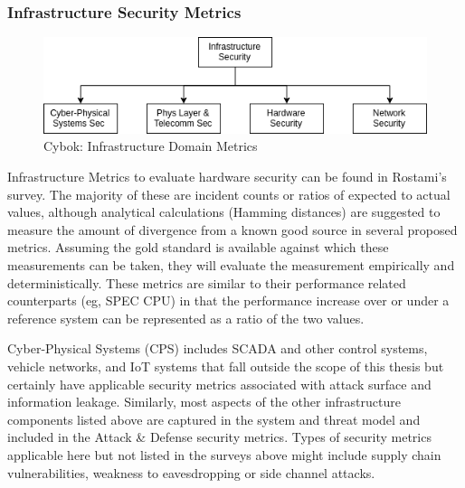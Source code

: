 

\subsubsection{Infrastructure Security Metrics}

\begin{figure}[ht]

\begin{mdframed}
\centering
\includegraphics[width=.75\linewidth]{resource/img/ch_background/cybok_metrics/cybok_infra.png}
\end{mdframed}
\caption{Cybok: Infrastructure Domain Metrics
\label{fig:background:cybok_infra_metrics}}
\end{figure} 


Infrastructure Metrics to evaluate hardware security can be found in Rostami’s survey\cite{Rostami_2013, Rostami_Koushanfar_Karri_2014}. The majority of these are incident counts or ratios of expected to actual values, although analytical calculations (Hamming distances) are suggested to measure the amount of divergence from a known good source in several proposed metrics. Assuming the gold standard is available against which these measurements can be taken, they will evaluate the measurement empirically and deterministically. These metrics are similar to their performance related counterparts (eg, SPEC CPU) in that the performance increase over or under a reference system can be represented as a ratio of the two values. 

Cyber-Physical Systems (CPS) includes SCADA and other control systems, vehicle networks, and IoT systems that fall outside the scope of this thesis but certainly have applicable security metrics associated with attack surface and information leakage. Similarly, most aspects of the other infrastructure components listed above are captured in the system and threat model and included in the Attack \& Defense security metrics. Types of security metrics applicable here but not listed in the surveys above might include supply chain vulnerabilities, weakness to eavesdropping or side channel attacks. 



